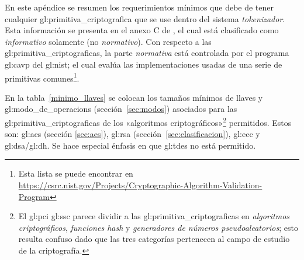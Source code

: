 %
%

%
En este apéndice se resumen los requerimientos mínimos que debe de tener
cualquier \gls{gl:primitiva_criptografica} que se use dentro del sistema
\textit{tokenizador}. Esta información se presenta en el anexo C de
\cite{pci_tokens}, el cual está clasificado como \textit{informativo} solamente
(no \textit{normativo}). Con respecto a las \glspl{gl:primitiva_criptografica},
la parte \textit{normativa} está controlada por el programa \gls{gl:cavp} del
\gls{gl:nist}; el cual evalúa las implementaciones usadas de una serie de
primitivas comunes\footnote{Esta lista se puede encontrar en
\url{https://csrc.nist.gov/Projects/Cryptographic-Algorithm-Validation-Program}}.

En la tabla~\ref{minimo_llaves} se colocan los tamaños mínimos de llaves y
\glspl{gl:modo_de_operacion} (sección~\ref{sec:modos}) asociados
para las \glspl{gl:primitiva_criptografica} de los «algoritmos
criptográficos»\footnote{El \gls{gl:pci} \gls{gl:ssc} parece dividir a las
\glspl{gl:primitiva_criptografica} en \textit{algoritmos criptográficos},
\textit{funciones hash} y \textit{generadores de números pseudoaleatorios};
esto resulta confuso dado que las tres categorías pertenecen al campo de
estudio de la criptografía.} permitidos. Estos son: \gls{gl:aes} (sección
\ref{sec:aes}), \gls{gl:rsa} (sección~\ref{sec:clasificacion}), \gls{gl:ecc} y
\gls{gl:dsa}/\gls{gl:dh}. Se hace especial énfasis en que \gls{gl:tdes} no
está permitido.



